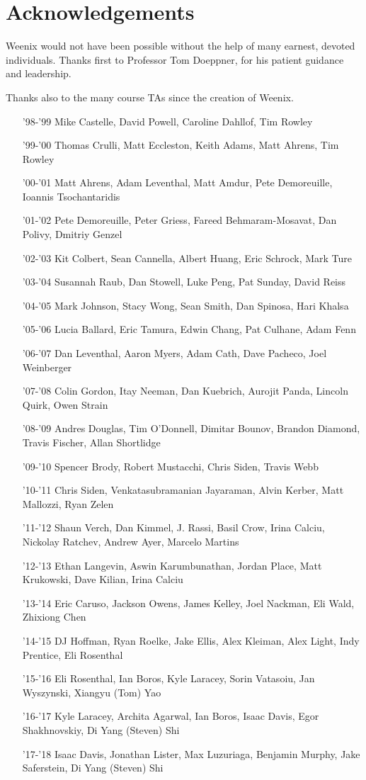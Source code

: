 \section{Acknowledgements}
Weenix would not have been possible without the help of many earnest, devoted individuals. Thanks first to Professor Tom Doeppner, for his patient guidance and leadership.

Thanks also to the many course TAs since the creation of Weenix.
\begin{itemize}
    \item['98-'99] Mike Castelle, David Powell, Caroline Dahllof, Tim Rowley
    \item['99-'00] Thomas Crulli, Matt Eccleston, Keith Adams, Matt Ahrens, Tim Rowley
    \item['00-'01] Matt Ahrens, Adam Leventhal, Matt Amdur, Pete Demoreuille, Ioannis Tsochantaridis
    \item['01-'02] Pete Demoreuille, Peter Griess, Fareed Behmaram-Mosavat, Dan Polivy, Dmitriy Genzel
    \item['02-'03] Kit Colbert, Sean Cannella, Albert Huang, Eric Schrock, Mark Ture
    \item['03-'04] Susannah Raub, Dan Stowell, Luke Peng, Pat Sunday, David Reiss
    \item['04-'05] Mark Johnson, Stacy Wong, Sean Smith, Dan Spinosa, Hari Khalsa
    \item['05-'06] Lucia Ballard, Eric Tamura, Edwin Chang, Pat Culhane, Adam Fenn
    \item['06-'07] Dan Leventhal, Aaron Myers, Adam Cath, Dave Pacheco, Joel Weinberger
    \item['07-'08] Colin Gordon, Itay Neeman, Dan Kuebrich, Aurojit Panda, Lincoln Quirk, Owen Strain
    \item['08-'09] Andres Douglas, Tim O'Donnell, Dimitar Bounov, Brandon Diamond, Travis Fischer, Allan Shortlidge
    \item['09-'10] Spencer Brody, Robert Mustacchi, Chris Siden, Travis Webb
    \item['10-'11] Chris Siden, Venkatasubramanian Jayaraman, Alvin Kerber, Matt Mallozzi, Ryan Zelen
    \item['11-'12] Shaun Verch, Dan Kimmel, J. Rassi, Basil Crow, Irina	Calciu, Nickolay Ratchev, Andrew Ayer, Marcelo Martins
    \item['12-'13] Ethan Langevin, Aswin Karumbunathan, Jordan Place, Matt Krukowski, Dave Kilian, Irina Calciu
    \item['13-'14] Eric Caruso, Jackson Owens, James Kelley, Joel Nackman, Eli Wald, Zhixiong Chen
    \item['14-'15] DJ Hoffman, Ryan Roelke, Jake Ellis, Alex Kleiman, Alex Light, Indy Prentice, Eli Rosenthal
    \item['15-'16] Eli Rosenthal, Ian Boros, Kyle Laracey, Sorin Vatasoiu, Jan Wyszynski, Xiangyu (Tom) Yao
    \item['16-'17] Kyle Laracey, Archita Agarwal, Ian Boros, Isaac Davis, Egor Shakhnovskiy, Di Yang (Steven) Shi
    \item['17-'18] Isaac Davis, Jonathan Lister, Max Luzuriaga, Benjamin Murphy, Jake Saferstein, Di Yang (Steven) Shi
\end{itemize}
